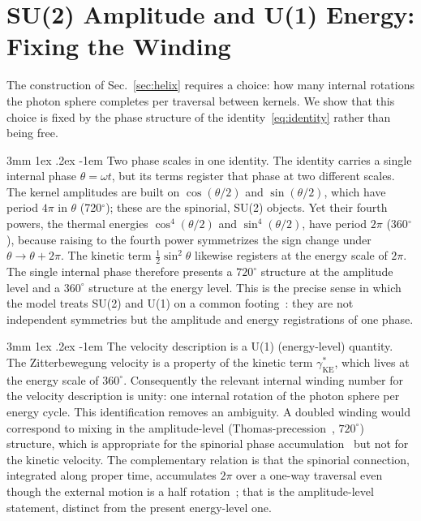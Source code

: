 \documentclass[%
 reprint, amsmath,amssymb, aps, prb, ]{revtex4-2}
\makeatletter
\numberwithin{equation}{section}
\renewcommand\paragraph{%
  \@startsection{paragraph}{4}{\z@}%
    {3mm \@plus 1ex \@minus .2ex}%
    {-1em}%
    {\normalfont\normalsize\itshape}}
\newcommand{\gKE}{\gamma^{*}_{\text{KE}}}
\makeatother
\begin{document}
\section{SU(2) Amplitude and U(1) Energy: Fixing the Winding}
\label{sec:winding}

The construction of Sec.~\ref{sec:helix} requires a choice: how many internal rotations the photon sphere completes per traversal between kernels. We show that this choice is fixed by the phase structure of the identity~\eqref{eq:identity} rather than being free.

\paragraph{Two phase scales in one identity.}
The identity carries a single internal phase $\theta=\omega t$, but its terms register that phase at two different scales. The kernel amplitudes are built on $\cos(\theta/2)$ and $\sin(\theta/2)$, which have period $4\pi$ in $\theta$ (720$^\circ$); these are the spinorial, SU(2) objects. Yet their fourth powers, the thermal energies $\cos^4(\theta/2)$ and $\sin^4(\theta/2)$, have period $2\pi$ (360$^\circ$), because raising to the fourth power symmetrizes the sign change under $\theta\to\theta+2\pi$. The kinetic term $\tfrac{1}{2}\sin^2\theta$ likewise registers at the energy scale of $2\pi$. The single internal phase therefore presents a $720^\circ$ structure at the amplitude level and a $360^\circ$ structure at the energy level. This is the precise sense in which the model treats SU(2) and U(1) on a common footing~\cite{hanamura19}: they are not independent symmetries but the amplitude and energy registrations of one phase.

\paragraph{The velocity description is a U(1) (energy-level) quantity.}
The Zitterbewegung velocity is a property of the kinetic term $\gKE$, which lives at the energy scale of $360^\circ$. Consequently the relevant internal winding number for the velocity description is unity: one internal rotation of the photon sphere per energy cycle. This identification removes an ambiguity. A doubled winding would correspond to mixing in the amplitude-level (Thomas-precession~\cite{thomas1926,thomas1927}, $720^\circ$) structure, which is appropriate for the spinorial phase accumulation~\cite{hanamura19,hanamura29} but not for the kinetic velocity. The complementary relation is that the spinorial connection, integrated along proper time, accumulates $2\pi$ over a one-way traversal even though the external motion is a half rotation~\cite{hanamura29}; that is the amplitude-level statement, distinct from the present energy-level one.
\end{document}
